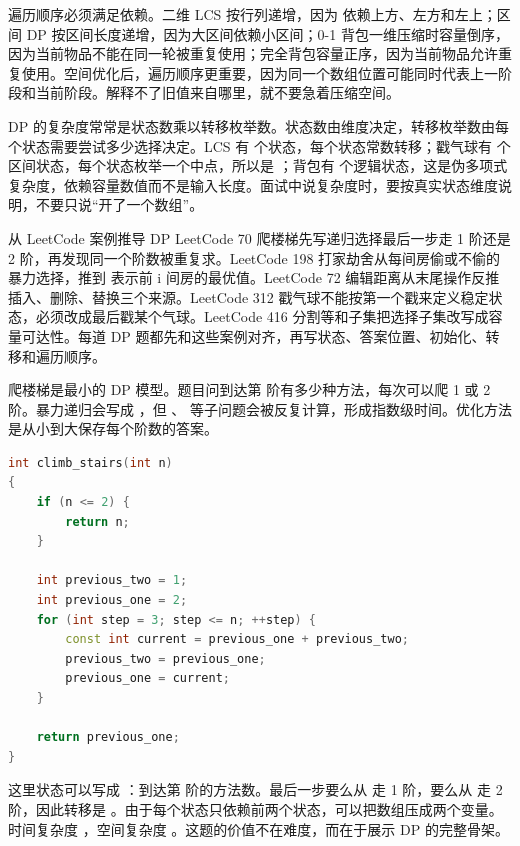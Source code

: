 遍历顺序必须满足依赖。二维 LCS 按行列递增，因为  依赖上方、左方和左上；区间 DP 按区间长度递增，因为大区间依赖小区间；0-1 背包一维压缩时容量倒序，因为当前物品不能在同一轮被重复使用；完全背包容量正序，因为当前物品允许重复使用。空间优化后，遍历顺序更重要，因为同一个数组位置可能同时代表上一阶段和当前阶段。解释不了旧值来自哪里，就不要急着压缩空间。

DP 的复杂度常常是状态数乘以转移枚举数。状态数由维度决定，转移枚举数由每个状态需要尝试多少选择决定。LCS 有  个状态，每个状态常数转移；戳气球有  个区间状态，每个状态枚举一个中点，所以是 ；背包有  个逻辑状态，这是伪多项式复杂度，依赖容量数值而不是输入长度。面试中说复杂度时，要按真实状态维度说明，不要只说“开了一个数组”。

\begin{principlebox}{从 LeetCode 案例推导 DP}
LeetCode 70 爬楼梯先写递归选择最后一步走 1 阶还是 2 阶，再发现同一个阶数被重复求。LeetCode 198 打家劫舍从每间房偷或不偷的暴力选择，推到  表示前 i 间房的最优值。LeetCode 72 编辑距离从末尾操作反推插入、删除、替换三个来源。LeetCode 312 戳气球不能按第一个戳来定义稳定状态，必须改成最后戳某个气球。LeetCode 416 分割等和子集把选择子集改写成容量可达性。每道 DP 题都先和这些案例对齐，再写状态、答案位置、初始化、转移和遍历顺序。
\end{principlebox}

爬楼梯是最小的 DP 模型。题目问到达第  阶有多少种方法，每次可以爬 1 或 2 阶。暴力递归会写成 ，但 、 等子问题会被反复计算，形成指数级时间。优化方法是从小到大保存每个阶数的答案。

\begin{lstlisting}[language=C++,caption={LeetCode 70 爬楼梯：滚动变量保存最近两个状态}]
int climb_stairs(int n)
{
    if (n <= 2) {
        return n;
    }

    int previous_two = 1;
    int previous_one = 2;
    for (int step = 3; step <= n; ++step) {
        const int current = previous_one + previous_two;
        previous_two = previous_one;
        previous_one = current;
    }

    return previous_one;
}
\end{lstlisting}

这里状态可以写成 ：到达第  阶的方法数。最后一步要么从  走 1 阶，要么从  走 2 阶，因此转移是 。由于每个状态只依赖前两个状态，可以把数组压成两个变量。时间复杂度 ，空间复杂度 。这题的价值不在难度，而在于展示 DP 的完整骨架。

